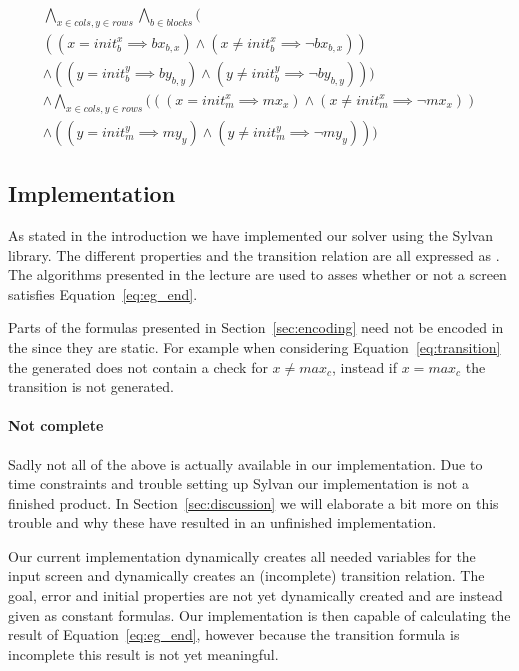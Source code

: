 \begin{multline} \label{eq:propInitial}
	\bigwedge_{x \in cols, y \in rows} \bigwedge_{b \in blocks} \bigg(\\  
		((x = init_b^x \implies bx_{b,x}) 
			\wedge (x \neq init_b^x \implies \neg bx_{b,x})) \\  
		\wedge ((y = init_b^y \implies by_{b,y}) 
			\wedge (y \neq init_b^y \implies \neg by_{b,y})) \bigg)\\  
	\wedge \bigwedge_{x \in cols, y \in rows} \Big(
		((x = init_m^x \implies mx_x) 
			\wedge (x \neq init_m^x \implies \neg mx_x)) \\  
		\wedge ((y = init_m^y \implies my_y) 
			\wedge (y \neq init_m^y \implies \neg my_y))
	\Big)
\end{multline}

\subsection{Implementation} \label{sec:implementation}
As stated in the introduction we have implemented our solver using the Sylvan
\robdd library. The different properties and the transition relation are all
expressed as \robdds. The algorithms presented in the lecture are used to 
asses whether or not a screen satisfies Equation~\ref{eq:eg_end}.

Parts of the formulas presented in Section~\ref{sec:encoding} need not be 
encoded in the \robdd since they are static. For example when considering
Equation~\ref{eq:transition} the generated \robdd does not contain a check for 
$x \neq max_c$, instead if $x = max_c$ the transition is not generated. 

\paragraph{Not complete} Sadly not all of the above is actually available in our
implementation. Due to time constraints and trouble setting up Sylvan our 
implementation is not a finished product. In Section~\ref{sec:discussion} we
will elaborate a bit more on this trouble and why these have resulted in an
unfinished implementation. 

Our current implementation dynamically creates all
needed variables for the input screen and dynamically creates an (incomplete)
transition relation. The goal, error and initial properties are not yet 
dynamically created and are instead given as constant formulas. Our 
implementation is then capable of calculating the result of 
Equation~\ref{eq:eg_end}, however because the transition formula is incomplete 
this result is not yet meaningful. 

